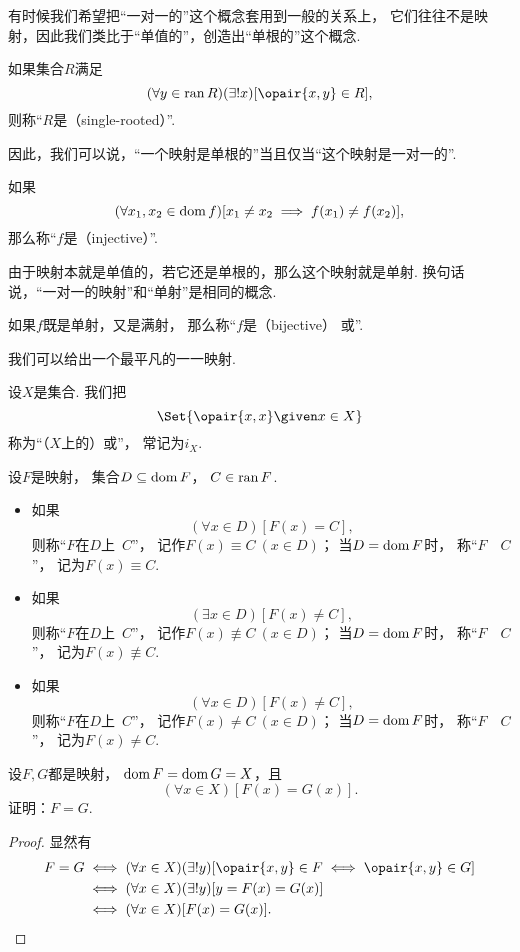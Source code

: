 有时候我们希望把“一对一的”这个概念套用到一般的关系上，
它们往往不是映射，因此我们类比于“单值的”，创造出“单根的”这个概念.
\begin{definition}
如果集合\(R\)满足\[
	(\forall y \in \ran R)
	(\exists! x)
	[\opair{x,y} \in R],
\]
则称“\(R\)是（single-rooted）”.
\end{definition}

因此，我们可以说，“一个映射是单根的”当且仅当“这个映射是一对一的”.

如果\[
	(\forall x_1, x_2 \in \operatorname{dom} f)
	[x_1 \neq x_2 \implies f(x_1) \neq f(x_2)],
\]
那么称“\(f\)是（injective）”.

由于映射本就是单值的，若它还是单根的，那么这个映射就是单射.
换句话说，“一对一的映射”和“单射”是相同的概念.

如果\(f\)既是单射，又是满射，
那么称“\(f\)是（bijective）
或”.

我们可以给出一个最平凡的一一映射.
\begin{definition}
设\(X\)是集合.
我们把\[
	\Set{ \opair{x,x} \given x \in X }
\]称为“（\(X\)上的）或”，
常记为\(i_X\).
\end{definition}

\begin{definition}
设\(F\)是映射，
集合\(D \subseteq \operatorname{dom} F\)，
\(C \in \operatorname{ran} F\).
\begin{itemize}
	\item 如果\[
		(\forall x \in D)[F(x) = C],
	\]
	则称“\(F\)在\(D\)上~\(C\)”，
	记作\(F(x) \equiv C\ (x \in D)\)；
	当\(D=\operatorname{dom} F\)时，
	称“\(F\)~~\(C\)”，
	记为\(F(x) \equiv C\).
	\item 如果\[
		(\exists x \in D)[F(x) \neq C],
	\]
	则称“\(F\)在\(D\)上~\(C\)”，
	记作\(F(x) \not\equiv C\ (x \in D)\)；
	当\(D=\operatorname{dom} F\)时，
	称“\(F\)~~\(C\)”，
	记为\(F(x) \not\equiv C\).
	\item 如果\[
		(\forall x \in D)[F(x) \neq C],
	\]
	则称“\(F\)在\(D\)上~\(C\)”，
	记作\(F(x) \neq C\ (x \in D)\)；
	当\(D=\operatorname{dom} F\)时，
	称“\(F\)~~\(C\)”，
	记为\(F(x) \neq C\).
\end{itemize}
\end{definition}

\begin{example}
设\(F,G\)都是映射，
\(\operatorname{dom} F = \operatorname{dom} G = X\)，且\[
	(\forall x \in X)[F(x) = G(x)].
\]
证明：\(F=G\).
\begin{proof}
显然有
\begin{align*}
	F=G
	&\iff (\forall x \in X)(\exists!y)[
		\opair{x,y} \in F
		\iff
		\opair{x,y} \in G
	] \\
	&\iff (\forall x \in X)(\exists!y)[
		y = F(x) = G(x)
	] \\
	&\iff (\forall x \in X)[F(x) = G(x)].
	\qedhere
\end{align*}
\end{proof}
\end{example}

